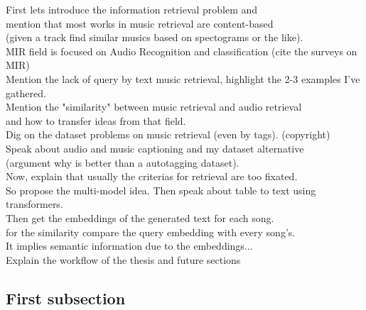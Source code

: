 \documentclass[11pt,a4paper,oldfontcommands]{memoir}
\begin{document}
\begin{multicols}{2}
First lets introduce the information retrieval problem and \\
    mention that most works in music retrieval are content-based  \\
    (given a track find similar musics based on spectograms or the like). \\
    MIR field is focused on Audio Recognition and classification (cite the surveys on MIR) \\
    Mention the lack of query by text music retrieval, highlight the 2-3 examples I've gathered. \\
    Mention the "similarity" between music retrieval and audio retrieval \\
    and how to transfer ideas from that field. \\
    Dig on the dataset problems on music retrieval (even by tags). (copyright) \\
    Speak about audio and music captioning and my dataset alternative \\
    (argument why is better than a autotagging dataset). \\
    Now, explain that usually the criterias for retrieval are too fixated.  \\
    So propose the multi-model idea. Then speak about table to text using transformers. \\
    Then get the embeddings of the generated text for each song. \\
    for the similarity compare the query embedding with every song's. \\
    It implies semantic information due to the embeddings...  \\

    Explain the workflow of the thesis and future sections

% 



\subsection{First subsection}


\end{multicols}
\end{document}
